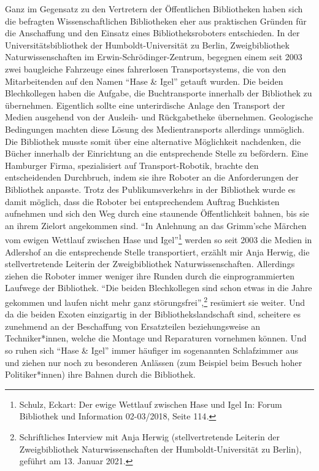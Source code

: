 \documentclass[a4paper,
fontsize=11pt,
oneside,
numbers=noperiodatend,
parskip=half-,
bibliography=totoc,
final
]{scrartcl}
\begin{document}
Ganz im Gegensatz zu den Vertretern der Öffentlichen Bibliotheken haben
sich die befragten Wissenschaftlichen Bibliotheken eher aus praktischen
Gründen für die Anschaffung und den Einsatz eines Bibliotheksroboters
entschieden. In der Universitätsbibliothek der Humboldt-Universität zu
Berlin, Zweigbibliothek Naturwissenschaften im
Erwin-Schrödinger-Zentrum, begegnen einem seit 2003 zwei baugleiche
Fahrzeuge eines fahrerlosen Transportsystems, die von den Mitarbeitenden
auf den Namen \enquote{Hase \& Igel} getauft wurden. Die beiden
Blechkollegen haben die Aufgabe, die Buchtransporte innerhalb der
Bibliothek zu übernehmen. Eigentlich sollte eine unterirdische Anlage
den Transport der Medien ausgehend von der Ausleih- und Rückgabetheke
übernehmen. Geologische Bedingungen machten diese Lösung des
Medientransports allerdings unmöglich. Die Bibliothek musste somit über
eine alternative Möglichkeit nachdenken, die Bücher innerhalb der
Einrichtung an die entsprechende Stelle zu befördern. Eine Hamburger
Firma, spezialisiert auf Transport-Robotik, brachte den entscheidenden
Durchbruch, indem sie ihre Roboter an die Anforderungen der Bibliothek
anpasste. Trotz des Publikumsverkehrs in der Bibliothek wurde es damit
möglich, dass die Roboter bei entsprechendem Auftrag Buchkisten
aufnehmen und sich den Weg durch eine staunende Öffentlichkeit bahnen,
bis sie an ihrem Zielort angekommen sind. \enquote{In Anlehnung an das
Grimm'sche Märchen vom ewigen Wettlauf zwischen Hase und
Igel}\footnote{Schulz, Eckart: Der ewige Wettlauf zwischen Hase und Igel
  In: Forum Bibliothek und Information 02-03/2018, Seite 114\emph{.}}
werden so seit 2003 die Medien in Adlershof an die entsprechende Stelle
transportiert, erzählt mir Anja Herwig, die stellvertretende Leiterin
der Zweigbibliothek Naturwissenschaften. Allerdings ziehen die Roboter
immer weniger ihre Runden durch die einprogrammierten Laufwege der
Bibliothek. \enquote{Die beiden Blechkollegen sind schon etwas in die
Jahre gekommen und laufen nicht mehr ganz störungsfrei},\footnote{Schriftliches
  Interview mit Anja Herwig (stellvertretende Leiterin der
  Zweigbibliothek Naturwissenschaften der Humboldt-Universität zu
  Berlin), geführt am 13. Januar 2021.} resümiert sie weiter. Und da
die beiden Exoten einzigartig in der Bibliothekslandschaft sind,
scheitere es zunehmend an der Beschaffung von Ersatzteilen
beziehungsweise an Techniker*innen, welche die Montage und Reparaturen
vornehmen können. Und so ruhen sich \enquote{Hase \& Igel} immer
häufiger im sogenannten Schlafzimmer aus und ziehen nur noch zu
besonderen Anlässen (zum Beispiel beim Besuch hoher Politiker*innen)
ihre Bahnen durch die Bibliothek.
\end{document}
